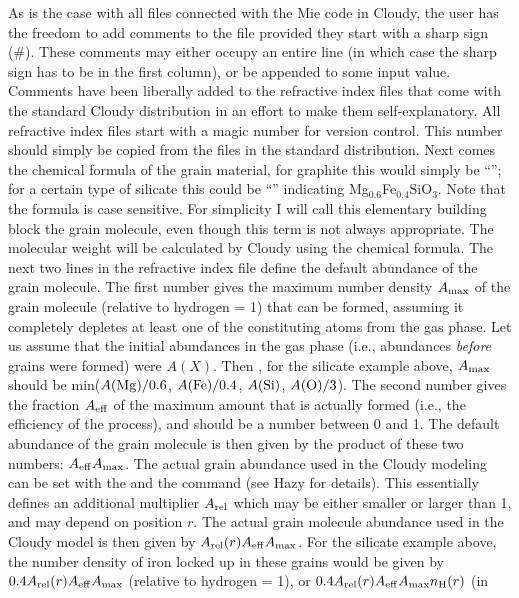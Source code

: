 As is the case with all files connected with the Mie code in Cloudy, the user
has the freedom to add comments to the file provided they start with a sharp
sign (\#). These comments may either occupy an entire line (in which case the
sharp sign has to be in the first column), or be appended to some input value.
Comments have been liberally added to the refractive index files that come
with the standard Cloudy distribution in an effort to make them
self-explanatory. All refractive index files start with a magic number for
version control. This number should simply be copied from the files in the
standard distribution. Next comes the chemical formula of the grain material,
for graphite this would simply be ``''; for a certain type of
silicate this could be ``'' indicating
Mg$_{0.6}$Fe$_{0.4}$SiO$_3$. Note that the formula is case sensitive. For
simplicity I will call this elementary building block the grain molecule, even
though this term is not always appropriate. The molecular weight will be
calculated by Cloudy using the chemical formula. The next two lines in the
refractive index file define the default abundance of the grain molecule. The
first number gives the maximum number density $A_{\rm max}$ of the grain
molecule (relative to hydrogen = 1) that can be formed, assuming it completely
depletes at least one of the constituting atoms from the gas phase. Let us
assume that the initial abundances in the gas phase (i.e., abundances {\em
  before} grains were formed) were $A(X)$. Then , for the silicate example
above, $A_{\rm max}$ should be min($A({\rm Mg})/0.6$, $A({\rm Fe})/0.4$,
$A({\rm Si})$, $A({\rm O})/3$). The second number gives the fraction $A_{\rm
  eff}$ of the maximum amount that is actually formed (i.e., the efficiency of
the process), and should be a number between 0 and 1. The default abundance of
the grain molecule is then given by the product of these two numbers: $A_{\rm
  eff} A_{\rm max}$. The actual grain abundance used in the Cloudy modeling
can be set with the  and the  command (see
Hazy for details). This essentially defines an additional multiplier $A_{\rm
  rel}$ which may be either smaller or larger than 1, and may depend on
position $r$. The actual grain molecule abundance used in the Cloudy model is
then given by $A_{\rm rel}(r) A_{\rm eff} A_{\rm max}$. For the silicate
example above, the number density of iron locked up in these grains would be
given by $0.4 A_{\rm rel}(r) A_{\rm eff} A_{\rm max}$ (relative to hydrogen =
1), or $0.4 A_{\rm rel}(r) A_{\rm eff} A_{\rm max} n_{\rm H}(r)$ (in
